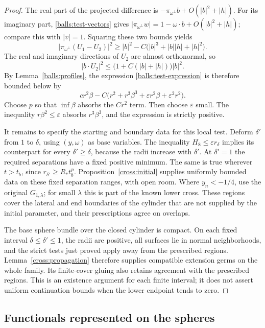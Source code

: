 \begin{proof}
The real part of the projected difference is
$-\pi_{\omega^\perp}b+O(|b|^2+|h|)$.  For its imaginary part,
\eqref{balls:test-vectors} gives
$|\pi_{\omega^\perp}w|=1-\omega\cdot b+O(|b|^2+|h|)$;
compare this with $|v|=1$.  Squaring these two bounds yields
\[
 |\pi_{\omega^\perp}(U_1-U_2)|^2
 \geq |b|^2-C\bigl(|b|^3+|b||h|+|h|^2\bigr).
\]
The real and imaginary directions of $U_2$ are almost orthonormal, so
\[
 |b\cdot U_2|^2\leq
       \bigl(1+C(|b|+|h|)\bigr)|b|^2.
\]
By Lemma~\ref{balls:profiles}, the expression
\eqref{balls:test-expression} is therefore bounded below by
\[
 c r^2\beta
  -C\bigl(r^2+r^3\beta^3+\varepsilon r^2\beta
                       +\varepsilon^2r^2\bigr).
\]
Choose $p$ so that $\inf\beta$ absorbs the $Cr^2$ term.  Then choose
$\varepsilon$ small.  The inequality $r\beta^2\leq\varepsilon$ absorbs
$r^3\beta^3$, and the expression is strictly positive.

It remains to specify the starting and boundary data for this local
test.  Deform $\delta'$ from $1$ to $\delta$, using $(y,\omega)$ as base
variables.  The inequality $H_8\leq\varepsilon r_\delta$ implies its
counterpart for every $\delta'\geq\delta$, because the radii increase
with $\delta'$.  At $\delta'=1$ the required separations have a fixed
positive minimum.  The same is true wherever $t>t_b$, since
$r_{\delta'}\geq R_*t_b^p$.  Proposition~\ref{cross:initial} supplies
uniformly bounded data on these fixed separation ranges, with open room.
Where $y_n<-1/4$, use the original $G_{1,\lambda}$; for small $\lambda$
this is part of the known lower cross.  These regions cover the lateral
and end boundaries of the cylinder that are not supplied by the initial
parameter, and their prescriptions agree on overlaps.

The base sphere bundle over the closed cylinder is compact.  On each
fixed interval $\delta\leq\delta'\leq1$, the radii are positive, all
surfaces lie in normal neighborhoods, and the strict tests just proved
apply away from the prescribed regions.  Lemma~\ref{cross:propagation}
therefore supplies compatible extension germs on the whole family.
Its finite-cover gluing also retains agreement with the prescribed
regions.  This is an existence argument for each finite interval; it
does not assert uniform continuation bounds when the lower endpoint
tends to zero.
\end{proof}

\subsection{Functionals represented on the spheres}


